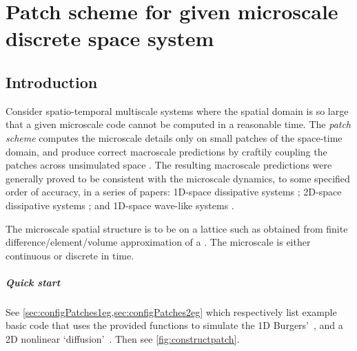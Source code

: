 \chapter{Patch scheme for given microscale discrete space system}
\label{sec:patch}
\localtableofcontents

\section{Introduction}


Consider spatio-temporal multiscale systems where
the spatial domain is so large that a given microscale code cannot be computed in a
reasonable time.  The \emph{patch scheme} computes the microscale details only on small
patches of the space-time domain, and produce correct
macroscale predictions by craftily coupling the patches
across unsimulated space \cite[e.g.]{Hyman2005, Samaey03b,
Samaey04, Roberts06d, Liu2015}.  The resulting macroscale
predictions were generally proved to be consistent with the
microscale dynamics, to some specified order of accuracy, in
a series of papers: 1D-space dissipative systems
\cite[]{Roberts06d, Bunder2013b}; 2D-space dissipative
systems \cite[]{Roberts2011a}; and 1D-space wave-like
systems \cite[]{Cao2014a}.

The microscale spatial structure is to be on a lattice such
as obtained from finite difference\slash element\slash volume approximation of a \pde.
The microscale is either continuous or discrete in time.

\paragraph{Quick start}
See \cref{sec:configPatches1eg,sec:configPatches2eg} which
respectively list example basic code that uses the provided 
functions to simulate the 1D Burgers'~\pde, and a 2D 
nonlinear `diffusion'~\pde.  Then see \cref{fig:constructpatch}.

